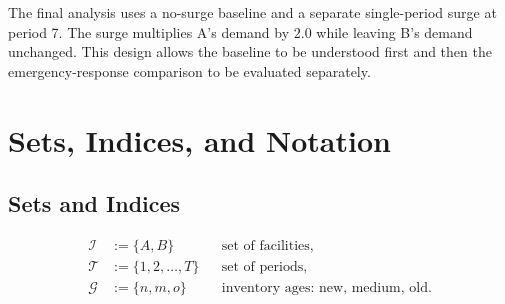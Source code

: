 \documentclass[11pt]{article}
\begin{document}
The final analysis uses a no-surge baseline and a separate single-period surge at period 7. The surge multiplies A's demand by $2.0$ while leaving B's demand unchanged. This design allows the baseline to be understood first and then the emergency-response comparison to be evaluated separately.

\section{Sets, Indices, and Notation}
\subsection{Sets and Indices}
\begin{align*}
\mathcal{I} &:= \{A,B\} && \text{set of facilities},\\
\mathcal{T} &:= \{1,2,\dots,T\} && \text{set of periods},\\
\mathcal{G} &:= \{n,m,o\} && \text{inventory ages: new, medium, old}.
\end{align*}
\end{document}
